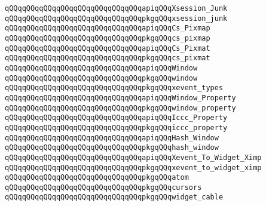 \newline
\verb|qQQqqQQqqQQqqQQqqQQqqQQqqQQqqQQqapiqQQqXsession_Junk|\newline
\verb|qQQqqQQqqQQqqQQqqQQqqQQqqQQqqQQqpkgqQQqxsession_junk|\newline
\newline
\verb|qQQqqQQqqQQqqQQqqQQqqQQqqQQqqQQqapiqQQqCs_Pixmap|\newline
\verb|qQQqqQQqqQQqqQQqqQQqqQQqqQQqqQQqpkgqQQqcs_pixmap|\newline
\newline
\verb|qQQqqQQqqQQqqQQqqQQqqQQqqQQqqQQqapiqQQqCs_Pixmat|\newline
\verb|qQQqqQQqqQQqqQQqqQQqqQQqqQQqqQQqpkgqQQqcs_pixmat|\newline
\newline
\verb|qQQqqQQqqQQqqQQqqQQqqQQqqQQqqQQqapiqQQqWindow|\newline
\verb|qQQqqQQqqQQqqQQqqQQqqQQqqQQqqQQqpkgqQQqwindow|\newline
\newline
\verb|qQQqqQQqqQQqqQQqqQQqqQQqqQQqqQQqpkgqQQqxevent_types|\newline
\newline
\verb|qQQqqQQqqQQqqQQqqQQqqQQqqQQqqQQqapiqQQqWindow_Property|\newline
\verb|qQQqqQQqqQQqqQQqqQQqqQQqqQQqqQQqpkgqQQqwindow_property|\newline
\newline
\verb|qQQqqQQqqQQqqQQqqQQqqQQqqQQqqQQqapiqQQqIccc_Property|\newline
\verb|qQQqqQQqqQQqqQQqqQQqqQQqqQQqqQQqpkgqQQqiccc_property|\newline
\newline
\verb|qQQqqQQqqQQqqQQqqQQqqQQqqQQqqQQqapiqQQqHash_Window|\newline
\verb|qQQqqQQqqQQqqQQqqQQqqQQqqQQqqQQqpkgqQQqhash_window|\newline
\newline
\verb|qQQqqQQqqQQqqQQqqQQqqQQqqQQqqQQqapiqQQqXevent_To_Widget_Ximp|\newline
\verb|qQQqqQQqqQQqqQQqqQQqqQQqqQQqqQQqpkgqQQqxevent_to_widget_ximp|\newline
\newline
\verb|qQQqqQQqqQQqqQQqqQQqqQQqqQQqqQQqpkgqQQqatom|\newline
\verb|qQQqqQQqqQQqqQQqqQQqqQQqqQQqqQQqpkgqQQqcursors|\newline
\verb|qQQqqQQqqQQqqQQqqQQqqQQqqQQqqQQqpkgqQQqwidget_cable|\newline
